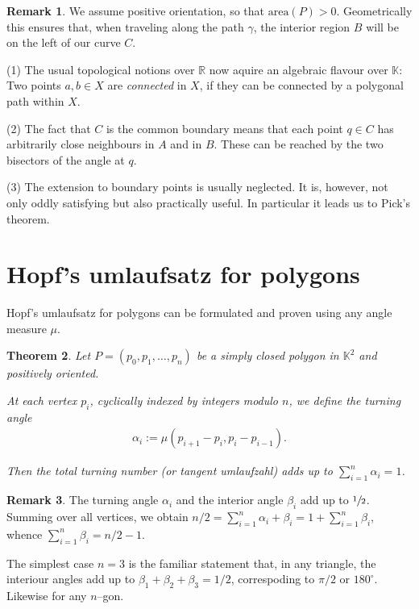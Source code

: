 \documentclass[a4paper]{amsart}
\numberwithin{equation}{section}
\theoremstyle{plain}
\newtheorem{theorem}{Theorem}[section]
\theoremstyle{definition}
\newtheorem{remark}[theorem]{Remark}
\newcommand{\R}{\mathbb{R}}
\newcommand{\K}{\mathbb{K}}
\newcommand{\ee}[2]{\mathopen] #1, #2 \mathclose[}
\newcommand{\area}{\mathrm{area}}
\begin{document}
\begin{remark}
  We assume positive orientation, so that $\area(P) > 0$.
  Geometrically this ensures that, when traveling along the path $\gamma$,
  the interior region $B$ will be on the left of our curve $C$.
  
  (1) The usual topological notions over $\R$
  now aquire an algebraic flavour over $\K$:
  Two points $a,b \in X$ are \emph{connected} in $X$,
  if they can be connected by a polygonal path within $X$.
  
  (2) The fact that $C$ is the common boundary means that
  each point $q \in C$ has arbitrarily close neighbours in $A$ and in $B$.
  These can be reached by the two bisectors of the angle at $q$.

  (3) The extension to boundary points is usually neglected. %
  It is, however, not only oddly satisfying but also practically useful.
  In particular it leads us to Pick's theorem. %
\end{remark}


\section{Hopf's umlaufsatz for polygons}

Hopf's umlaufsatz for polygons can be formulated
and proven using any angle measure $\mu$.

\begin{theorem}
  Let $P = (p_0,p_1,\ldots,p_n)$ be a simply closed
  polygon in $\K^2$ and positively oriented.
  
  At each vertex $p_i$, cyclically indexed
  by integers modulo $n$, we define the turning angle
  \begin{align*}
    \alpha_i := \mu(p_{i+1}-p_i, p_i-p_{i-1}) .
  \end{align*}

  Then the total turning number (or tangent umlaufzahl)
  adds up to $\sum_{i=1}^n \alpha_i = 1$.
\end{theorem}

\begin{remark}
  The turning angle $\alpha_i$ and the interior angle $\beta_i$
  add up to $\sfrac{1}{2}$.  Summing over all vertices, we obtain
  $n/2 = \sum_{i=1}^n \alpha_i + \beta_i = 1 + \sum_{i=1}^n \beta_i$,
  whence $\sum_{i=1}^n \beta_i = n/2 - 1$.

  The simplest case $n=3$ is the familiar statement that,
  in any triangle, the interiour angles add up
  to $\beta_1 + \beta_2 + \beta_3 = 1/2$,
  correspoding to $\pi/2$ or $180^\circ$.
  Likewise for any $n$--gon.
\end{remark}
\end{document}
